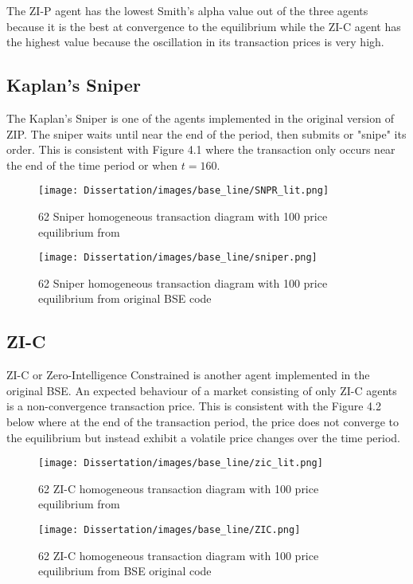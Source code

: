 The ZI-P agent has the lowest Smith's alpha value out of the three agents because it is the best at convergence to the equilibrium while the ZI-C agent has the highest value because the oscillation in its transaction prices is very high. 

\subsection{Kaplan's Sniper}
The Kaplan's Sniper is one of the agents implemented in the original version of ZIP. The sniper waits until near the end of the period, then submits or "snipe" its order. This is consistent with Figure 4.1 where the transaction only occurs near the end of the time period or when $t = 160$.

\begin{figure}[!htbp]
\texttt{[image: Dissertation/images/base\_line/SNPR\_lit.png]}
\caption{62 Sniper homogeneous transaction diagram with 100 price equilibrium from \cite{BSE_lit}} 
\end{figure} 
\FloatBarrier

\begin{figure}[!htbp]
\texttt{[image: Dissertation/images/base\_line/sniper.png]}
\caption{62 Sniper homogeneous transaction diagram with 100 price equilibrium from original BSE code} 
\end{figure} 
\FloatBarrier

\subsection{ZI-C}
ZI-C or Zero-Intelligence Constrained is another agent implemented in the original BSE. An expected behaviour of a market consisting of only ZI-C agents is a non-convergence transaction price. This is consistent with the Figure 4.2 below where at the end of the transaction period, the price does not converge to the equilibrium but instead exhibit a volatile price changes over the time period. 

\begin{figure}[h]
\texttt{[image: Dissertation/images/base\_line/zic\_lit.png]}
\caption{62 ZI-C homogeneous transaction diagram with 100 price equilibrium from \cite{BSE_lit}} 
\end{figure} 
\FloatBarrier

\begin{figure}[!htbp]
\texttt{[image: Dissertation/images/base\_line/ZIC.png]}
\caption{62 ZI-C homogeneous transaction diagram with 100 price equilibrium from BSE original code} 
\end{figure} 
\FloatBarrier



